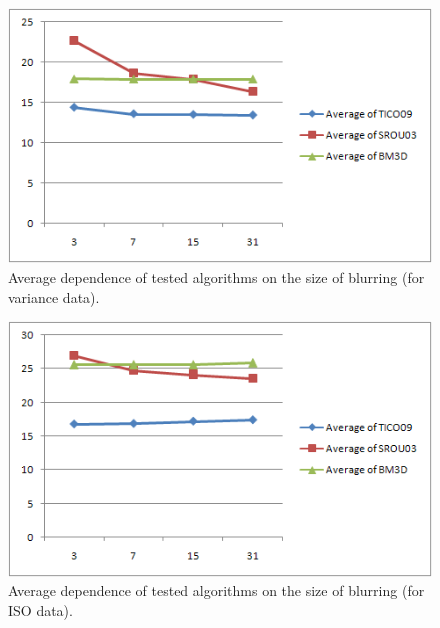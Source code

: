 \documentclass[12pt,notitlepage]{report}
\begin{document}
\begin{figure}[htb]
 \begin{center}
  \includegraphics[width=12cm]{avg_methods_vs_psf_size.png}
 \end{center}
 \caption{Average dependence of tested algorithms on the size of blurring (for variance data).}
 \label{fig:avg_methods_vs_psf_size}
\end{figure}

\begin{figure}[htb]
 \begin{center}
  \includegraphics[width=12cm]{avg_methods_vs_ISO_psf_size.png}
 \end{center}
 \caption{Average dependence of tested algorithms on the size of blurring (for ISO data).}
 \label{fig:avg_methods_vs_ISO_psf_size}
\end{figure}
\end{document}
